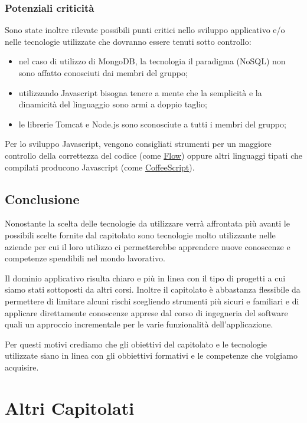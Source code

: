 \documentclass[12pt,a4paper]{article}
\begin{document}
\subsubsection{Potenziali criticità}

Sono state inoltre rilevate possibili punti critici nello sviluppo applicativo e/o nelle tecnologie utilizzate
che dovranno essere tenuti sotto controllo:

\begin{itemize}
\item nel caso di utilizzo di MongoDB, la tecnologia il paradigma (NoSQL) non sono affatto conosciuti dai membri del gruppo;
\item utilizzando Javascript bisogna tenere a mente che la semplicità e la dinamicità del linguaggio sono armi a doppio taglio;
\item le librerie Tomcat e Node.js sono sconosciute a tutti i membri del gruppo;
\end{itemize}
Per lo sviluppo Javascript, vengono consigliati strumenti per un maggiore controllo della correttezza del codice (come \href{http://flowtype.org}{Flow}) oppure altri linguaggi tipati che compilati producono Javascript (come \href{http://coffeescript.org}{CoffeeScript}).

\subsection{Conclusione}

Nonostante la scelta delle tecnologie da utilizzare verrà affrontata più avanti le possibili scelte fornite dal capitolato sono tecnologie molto utilizzante nelle aziende per cui il loro utilizzo ci permetterebbe apprendere nuove conoscenze e competenze spendibili nel mondo lavorativo.

Il dominio applicativo risulta chiaro e più in linea con il tipo di progetti a cui siamo stati sottoposti da altri corsi. Inoltre il capitolato è abbastanza flessibile da permettere di limitare alcuni rischi scegliendo strumenti più sicuri e familiari e di applicare direttamente conoscenze apprese dal corso di ingegneria del software quali un approccio incrementale per le varie funzionalità dell'applicazione.

Per questi motivi crediamo che gli obiettivi del capitolato e le tecnologie utilizzate siano in linea con gli obbiettivi formativi e le competenze che volgiamo acquisire.

\newpage
\section{Altri Capitolati}
\end{document}
